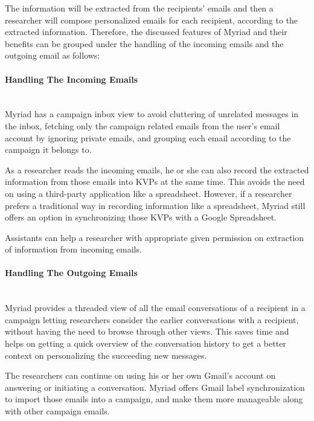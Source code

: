The information will be extracted from the recipients' emails and then a researcher will compose personalized emails for each recipient, according to the extracted information. Therefore, the discussed features of Myriad and their benefits can be grouped under the handling of the incoming emails and the outgoing email as follows:
\vspace{1cm}

\paragraph{Handling The Incoming Emails} \mbox{}\\

Myriad has a campaign inbox view to avoid cluttering of unrelated messages in the inbox, fetching only the campaign related emails from the user's email account by ignoring private emails, and grouping each email according to the campaign it belongs to.
\vspace{1cm}

As a researcher reads the incoming emails, he or she can also record the extracted information from those emails into \ac{KVP}s at the same time. This avoids the need on using a third-party application like a spreadsheet. However, if a researcher prefers a traditional way in recording information like a spreadsheet, Myriad still offers an option in synchronizing those \ac{KVP}s with a Google Spreadsheet.
\vspace{1cm}

Assistants can help a researcher with appropriate given permission on extraction of information from incoming emails.

\paragraph{Handling The Outgoing Emails} \mbox{}\\

Myriad provides a threaded view of all the email conversations of a recipient in a campaign letting researchers consider the earlier conversations with a recipient, without having the need to browse through other views. This saves time and helps on getting a quick overview of the conversation history to get a better context on personalizing the succeeding new messages.
\vspace{1cm}

The researchers can continue on using his or her own Gmail's account on answering or initiating a conversation. Myriad offers Gmail label synchronization to import those emails into a campaign, and make them more manageable along with other campaign emails.
\vspace{1cm}

